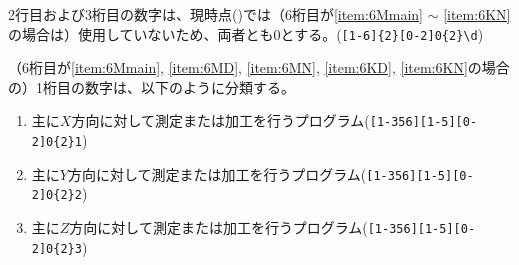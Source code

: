 2行目および3桁目の数字は、現時点(\customtodayap)では（6桁目が\ref{item:6Mmain} $\sim$ \ref{item:6KN}\hx の場合は）使用していないため、両者とも0とする。(\verb|[1-6]{2}[0-2]0{2}\d|)



（6桁目が\ref{item:6Mmain}, \ref{item:6MD}, \ref{item:6MN}, \ref{item:6KD}, \ref{item:6KN}\hx の場合の）1桁目の数字は、以下のように分類する。
\begin{enumerate}[label=\arabic*.]
\item 主に$X$方向に対して測定または加工を行うプログラム(\verb|[1-356][1-5][0-2]0{2}1|)
\item 主に$Y$方向に対して測定または加工を行うプログラム(\verb|[1-356][1-5][0-2]0{2}2|)
\item 主に$Z$方向に対して測定または加工を行うプログラム(\verb|[1-356][1-5][0-2]0{2}3|)
\end{enumerate}
